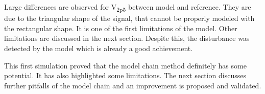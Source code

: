 Large differences are observed for V\textsubscript{2p5} between model and reference.
They are due to the triangular shape of the signal, that cannot be properly modeled with the rectangular shape.
It is one of the first limitations of the model.
Other limitations are discussed in the next section.
Despite this, the disturbance was detected by the model which is already a good achievement.

This first simulation proved that the model chain method definitely has some potential.
It has also highlighted some limitations.
The next section discusses further pitfalls of the model chain and an improvement is proposed and validated.
